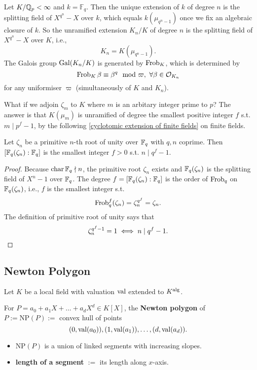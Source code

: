 \begin{example}
    Let $K/\mathbb{Q}_p < \infty$ and $k = \mathbb{F}_q$.
    Then the unique extension of $k$ of degree $n$ is the splitting field of $X^{q^n} - X$ over $k$, which equals $k(\mu_{q^n - 1})$ once we fix an algebraic closure of $k$.
    So the unramified extension $K_n/K$ of degree $n$ is the splitting field of $X^{q^n} - X$ over $K$, i.e., \[K_n = K(\mu_{q^{n} - 1}).\] The Galois group $\operatorname{Gal}(K_n/K)$ is generated by $\operatorname{Frob}_K$, which is determined by \[\operatorname{Frob}_K\beta \equiv \beta^q \mod\varpi,\ \forall\beta\in\mathcal{O}_{K_n}\]for any uniformiser $\varpi$ (simultaneously of $K$ and $K_n$).

    What if we adjoin $\zeta_{m}$ to $K$ where $m$ is an arbitary integer prime to $p$?
    The answer is that $K(\mu_m)$ is unramified of degree the smallest positive integer $f$ s.t. $m \mid p^f - 1$, by the following \cref{cyclotomic extension of finite fields} on finite fields.
\end{example}

\begin{lemma}\label{cyclotomic extension of finite fields}
    Let $\zeta_n$ be a primitive $n$-th root of unity over $\mathbb{F}_q$ with $q, n$ coprime. Then $[\mathbb{F}_q(\zeta_n) : \mathbb{F}_q]$ is the smallest integer $f > 0$ s.t. $n \mid q^f - 1$.
\end{lemma}
\begin{proof}
    Because $\operatorname{char}\mathbb{F}_q\nmid n$, the primitive root $\zeta_n$ exists and $\mathbb{F}_q(\zeta_n)$ is the splitting field of $X^n - 1$ over $\mathbb{F}_q$.
    The degree $f = [\mathbb{F}_q(\zeta_n) : \mathbb{F}_q]$ is the order of $\operatorname{Frob}_q$ on $\mathbb{F}_q(\zeta_n)$, i.e., $f$ is the smallest integer s.t. \[\operatorname{Frob}_q^f(\zeta_n) = \zeta_n^{q^f} = \zeta_n.\] The definition of primitive root of unity says that \[\zeta_n^{q^f -1} = 1\iff n \mid q^f - 1.\qedhere\]
\end{proof}

\subsection{Newton Polygon}
Let $K$ be a local field with valuation $\operatorname{val}$ extended to $K^{\mathrm{alg}}$.

For $P = a_0 + a_1 X + \dots + a_dX^d\in K[X]$,
the \textbf{Newton polygon} of $P := \mathrm{NP}(P) := $ convex hull of points \[(0, \operatorname{val}(a_0)), (1, \operatorname{val}(a_1)),\dots, (d, \operatorname{val}(a_d)).\]
\begin{itemize}
    \item $\mathrm{NP}(P)$ is a union of linked segments with increasing slopes.
    \item \textbf{length of a segment} $:=$ its length along $x$-axis.
\end{itemize}

